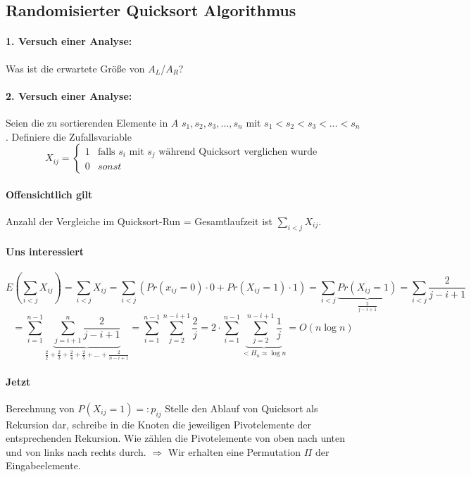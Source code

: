 \subsection{Randomisierter Quicksort Algorithmus}
\paragraph*{1. Versuch einer Analyse:} Was ist die erwartete Größe von $A_L$/$A_R$?

\paragraph*{2. Versuch einer Analyse:} Seien die zu sortierenden Elemente in $A$ $s_1,s_2,s_3,\dots,s_n$ mit $s_1<s_2<s_3<\dots<s_n$.
Definiere die Zufallsvariable
\begin{equation}
   X_{ij} =
   \begin{cases}
     1 & \text{falls } s_i \text{ mit } s_j \text{ während Quicksort verglichen wurde} \\
     0 & sonst
   \end{cases}
\end{equation}
\paragraph*{Offensichtlich gilt} Anzahl der Vergleiche im Quicksort-Run = Gesamtlaufzeit ist $\sum\limits_{i<j} X_{ij}$.

\paragraph*{Uns interessiert} $$E(\sum\limits_{i<j} X_{ij})
= \sum\limits_{i<j} X_{ij} 
= \sum\limits_{i<j}(Pr(x_{ij}=0) \cdot 0 + Pr(X_{ij}=1) \cdot 1) 
= \sum\limits_{i<j} \underbrace{Pr(X_{ij}=1)}_{\frac{2}{j-i+1}} 
= \sum\limits_{i<j} \frac{2}{j-i+1}$$
$$= \sum\limits_{i=1}^{n-1} \underbrace{\sum\limits_{j=i+1}^n \frac{2}{j-i+1}}_{\frac{2}{2}+\frac{2}{3}+\frac{2}{4}+\frac{2}{5}+\dots+\frac{2}{n-i+1}} 
= \sum\limits_{i=1}^{n-1} \sum\limits_{j=2}^{n-i+1} \frac{2}{j}
= 2 \cdot \sum\limits_{i=1}^{n-1} \underbrace{\sum\limits_{j=2}^{n-i+1} \frac{1}{j}}_{<H_n \approx \log n} 
= O(n \log n) $$ %

\paragraph*{Jetzt} Berechnung von $P(X_{ij}=1) =: p_{ij}$ Stelle den Ablauf von Quicksort als Rekursion dar, schreibe in die Knoten die jeweiligen Pivotelemente der entsprechenden Rekursion. Wie zählen die Pivotelemente von oben nach unten und von links nach rechts durch. $\Rightarrow$ Wir erhalten eine Permutation $\Pi$ der Eingabeelemente.

